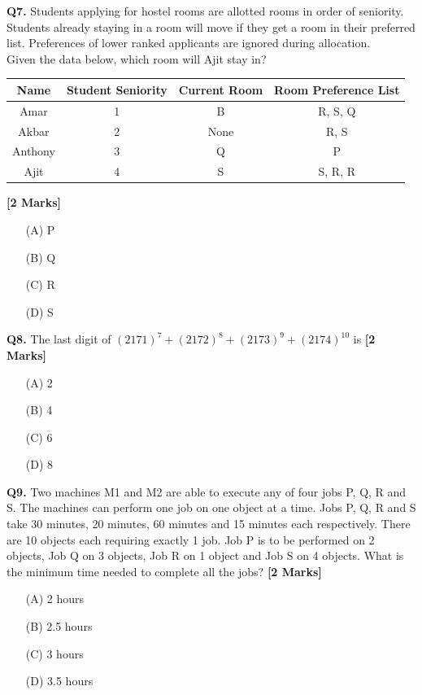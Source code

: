 \documentclass[11pt]{article}
\newcommand{\questionb}[2]{
    \noindent\textbf{Q#2.} #1 \hfill \textbf{[2 Marks]}
}
\begin{document}
\questionb{Students applying for hostel rooms are allotted rooms in order of seniority. Students already staying in a room will move if they get a room in their preferred list. Preferences of lower ranked applicants are ignored during allocation. \\ Given the data below, which room will Ajit stay in?

\begin{center}
\begin{tabular}{|c|c|c|c|}
\hline
Name & Student Seniority & Current Room & Room Preference List \\
\hline
Amar & 1 & B & R, S, Q \\
Akbar & 2 & None & R, S \\
Anthony & 3 & Q & P \\
Ajit & 4 & S & S, R, R \\
\hline
\end{tabular}
\end{center}}{7}
\begin{enumerate}
    \item[(A)] P  
    \item[(B)] Q  
    \item[(C)] R  
    \item[(D)] S  
\end{enumerate}
\vspace{0.5cm}

\questionb{The last digit of \( (2171)^7 + (2172)^8 + (2173)^9 + (2174)^{10} \) is}{8}
\begin{enumerate}
    \item[(A)] 2  
    \item[(B)] 4  
    \item[(C)] 6  
    \item[(D)] 8  
\end{enumerate}
\vspace{0.5cm}

\questionb{Two machines M1 and M2 are able to execute any of four jobs P, Q, R and S. The machines can perform one job on one object at a time. Jobs P, Q, R and S take 30 minutes, 20 minutes, 60 minutes and 15 minutes each respectively. There are 10 objects each requiring exactly 1 job. Job P is to be performed on 2 objects, Job Q on 3 objects, Job R on 1 object and Job S on 4 objects. What is the minimum time needed to complete all the jobs?}{9}
\begin{enumerate}
    \item[(A)] 2 hours  
    \item[(B)] 2.5 hours  
    \item[(C)] 3 hours  
    \item[(D)] 3.5 hours  
\end{enumerate}
\vspace{0.5cm}
\end{document}

